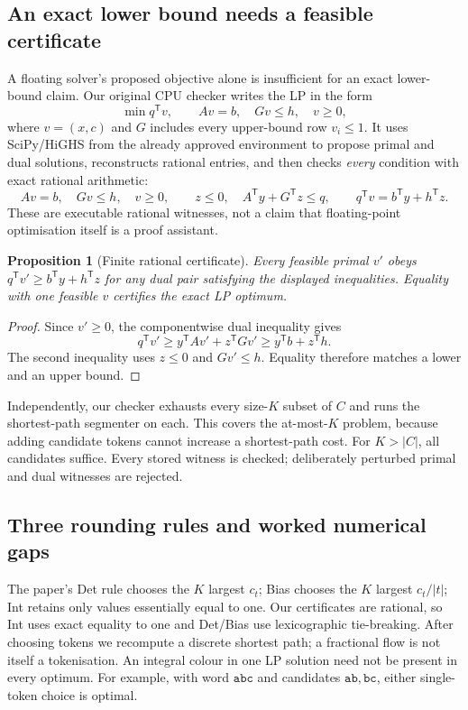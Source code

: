 \documentclass[11pt,oneside,openany]{book}
\newtheorem{proposition}[theorem]{Proposition}
\theoremstyle{definition}\newtheorem{definition}[theorem]{Definition}
\theoremstyle{remark}\newtheorem{remark}[theorem]{Remark}
\begin{document}
\subsection{An exact lower bound needs a feasible certificate}
A floating solver's proposed objective alone is insufficient for an
exact lower-bound claim. Our original CPU checker writes the LP in the
form
\[
 \min q^{\mathsf T}v,\qquad Av=b,\quad Gv\le h,\quad v\ge0,
\]
where $v=(x,c)$ and $G$ includes every upper-bound row $v_i\le1$.
It uses SciPy/HiGHS from the already approved environment to propose
primal and dual solutions, reconstructs rational entries, and then checks
\emph{every} condition with exact rational arithmetic:
\[
 Av=b,\quad Gv\le h,\quad v\ge0,\qquad
 z\le0,\quad A^{\mathsf T}y+G^{\mathsf T}z\le q,
 \qquad q^{\mathsf T}v=b^{\mathsf T}y+h^{\mathsf T}z.
\]
These are executable rational witnesses, not a claim that floating-point
optimisation itself is a proof assistant.
\begin{proposition}[Finite rational certificate]
Every feasible primal $v'$ obeys
$q^{\mathsf T}v'\ge b^{\mathsf T}y+h^{\mathsf T}z$ for any dual pair
satisfying the displayed inequalities. Equality with one feasible $v$
certifies the exact LP optimum.
\end{proposition}
\begin{proof}
Since $v'\ge0$, the componentwise dual inequality gives
\[
 q^{\mathsf T}v'\ge y^{\mathsf T}Av'+z^{\mathsf T}Gv'
 \ge y^{\mathsf T}b+z^{\mathsf T}h.
\]
The second inequality uses $z\le0$ and $Gv'\le h$. Equality therefore
matches a lower and an upper bound.
\end{proof}
Independently, our checker exhausts every size-$K$ subset of $C$ and runs
the shortest-path segmenter on each. This covers the at-most-$K$ problem,
because adding candidate tokens cannot increase a shortest-path cost.
For $K>|C|$, all candidates suffice. Every stored witness is checked;
deliberately perturbed primal and dual witnesses are rejected.

\subsection{Three rounding rules and worked numerical gaps}
The paper's Det rule chooses the $K$ largest $c_t$; Bias chooses the
$K$ largest $c_t/|t|$; Int retains only values essentially equal to one.
Our certificates are rational, so Int uses exact equality to one and
Det/Bias use lexicographic tie-breaking. After choosing tokens we
recompute a discrete shortest path; a fractional flow is not itself a
tokenisation. An integral colour in one LP solution need not be present
in every optimum. For example, with word $\mathtt{abc}$ and candidates
$\mathtt{ab},\mathtt{bc}$, either single-token choice is optimal.
\end{document}
